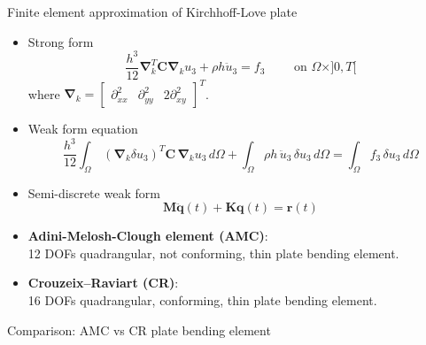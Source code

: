 \documentclass[aspectratio=169]{beamer}
\begin{document}
{  \begin{frame}{Finite element approximation of Kirchhoff-Love plate}
    \begin{itemize}
      \small
      \item Strong form
            $$
              \frac{h^3}{12}\boldsymbol{\nabla}_k^T \boldsymbol{C}\boldsymbol{\nabla}_ku_3+\rho h \ddot{u}_3=f_3 \qquad \text{  on  }\Omega\times]0,T[
            $$
            where $\boldsymbol{\nabla}_k=\begin{bmatrix}
                \partial^2_{xx} &
                \partial^2_{yy} &
                2\partial^2_{xy}
              \end{bmatrix}^T$.
      \item Weak form equation
            \[
              \frac{h^3}{12}\int_\Omega \, (\boldsymbol{\nabla}_k \delta u_3)^T\mathbf C \, \boldsymbol{\nabla}_k u_3  \, d\Omega + \int_\Omega \rho h\, \ddot u_3 \, \delta u_3 \, d\Omega = \int_\Omega f_3\, \delta u_3 \, d\Omega
            \]
      \item  Semi-discrete weak form
            $$\mathbf M\ddot{\mathbf q}(t)+\mathbf K\mathbf q(t)=\mathbf r(t)$$
    \end{itemize}

    \begin{tcolorbox}[colback=darkred!10,colframe=darkred!40!black]
      \begin{itemize}
        \item  \textbf{Adini-Melosh-Clough element (AMC)}: \\ 12 DOFs quadrangular, not conforming, thin plate bending element.
        \item  \textbf{Crouzeix–Raviart (CR)}: \\ 16 DOFs quadrangular, conforming, thin plate bending element.
      \end{itemize}
    \end{tcolorbox}
  \end{frame}

  \begin{frame}{Comparison: AMC vs CR plate bending element}


\end{frame}}
\end{document}
